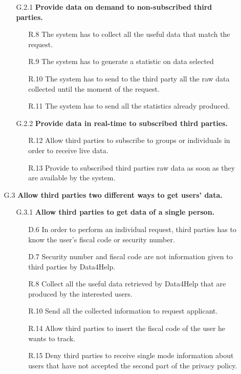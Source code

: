 \begin{enumerate}
\begin{enumerate}
		\begin{enumerate} 
		\item [G.2.1] \textbf{Provide data on demand to non-subscribed third parties.}
		\begin{enumerate} 

		\item [R.8] The system has to collect all the useful data that match the request.
		\item [R.9] The system has to generate a statistic on data selected 
		\item [R.10] The system has to send to the third party all the raw data collected until the moment of the request.
		\item [R.11] The system has to send all the statistics already produced.
    	\end{enumerate}	
    	
    	\item [G.2.2] \textbf{Provide data in real-time to subscribed third parties.}
		\begin{enumerate}
    	\item [R.12] Allow third parties to subscribe to groups or individuals in order to receive live data.
    	\item [R.13] Provide to subscribed third parties raw data as soon as they are available by the system.
    	\end{enumerate}
    	\end{enumerate}
    
	\item [G.3] \textbf{Allow third parties two different ways to get users' data.}
		\begin{enumerate}     
    	\item [G.3.1] \textbf{Allow third parties to get data of a single person.}
		\begin{enumerate}
		\item [D.6] In order to perform an individual request, third parties has to know the user's fiscal code or security number.
		\item [D.7] Security number and fiscal code are not information given to third parties by Data4Help.
    	\item [R.8] Collect all the useful data retrieved by Data4Help that are produced by the interested users. 
    	\item [R.10] Send all the collected information to request applicant.
    	\item [R.14] Allow third parties to insert the fiscal code of the user he wants to track.
    	\item [R.15] Deny third parties to receive single mode information about users that have not accepted the second part of the privacy policy.
    	\end{enumerate}
    

\end{enumerate}
\end{enumerate}
\end{enumerate}
